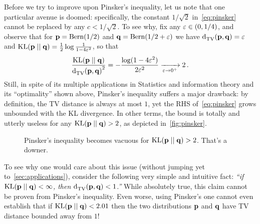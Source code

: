 \documentclass[10pt]{article}
\begin{document}
Before we try to improve upon Pinsker's inequality, let us note that one particular avenue is doomed: specifically, the constant $1/\sqrt{2}$ in~\eqref{eq:pinsker} cannot be replaced by any $c<1/\sqrt{2}$. To see why, fix any $\varepsilon\in(0,1/4)$, and observe that for $\mathbf{p}=\operatorname{Bern}( 1/2 ) $ and $\mathbf{q}=\operatorname{Bern}( 1/2+\varepsilon ) $ we have $\totalvardist{\p}{\q} = \eps$ and $\kldiv{\p}{\q}=\frac{1}{2}\log\frac{1}{1-4\eps^2}$, so that
\begin{equation}
  \frac{\kldiv{\p}{\q}}{\totalvardist{\p}{\q}^2} = -\frac{\log(1-4\eps^2)}{2\eps^2} \xrightarrow[\eps\to 0^+]{}2\,.
\end{equation}
Still, in spite of its multiple applications in Statistics and information theory and its ``optimality'' shown above, Pinsker's inequality suffers a major drawback: by definition, the TV distance is always at most $1$, yet the RHS of~\eqref{eq:pinsker} grows unbounded with the KL divergence. In other terms, the bound is totally and utterly useless for any $\kldiv{\p}{\q}>2$, as depicted in~\autoref{fig:pinsker}.
\begin{figure}[H]\centering
{} 
\caption{\label{fig:pinsker}Pinsker's inequality becomes vacuous for $\kldiv{\p}{\q}>2$. That's a downer.}
\end{figure}
To see why one would care about this issue (without jumping yet to~\autoref{sec:applications}), consider the following very simple and intuitive fact: \emph{``if $\kldiv{\p}{\q}<\infty$, then $\totalvardist{\p}{\q} < 1$.''}  While absolutely true, this claim cannot be proven from Pinsker's inequality. Even worse, using Pinsker's one cannot even establish that if $\kldiv{\p}{\q}< 2.01$ then the two distributions $\mathbf{p}$ and $\mathbf{q}$ have TV distance bounded away from $1$!


\end{document}
